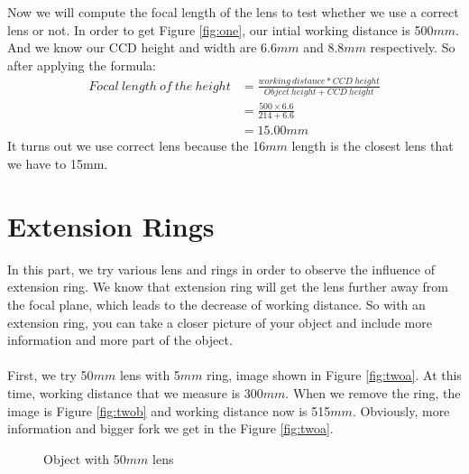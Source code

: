 \documentclass[english]{article}
\begin{document}
Now we will compute the focal length of the lens to test whether we use a correct lens or not.
In order to get Figure \ref{fig:one}, our intial working distance is 500$mm$.
And we know our CCD height and width are 6.6$mm$ and 8.8$mm$ respectively.
So after applying the formula:
\begin{align*} 
	Focal\ length\ of\ the\ height &= \frac{working\ distance * CCD\ height}{Object\ height + CCD\ height}\\
	&= \frac{500 \times 6.6}{214 + 6.6} \\
	&= 15.00mm
\end{align*}
It turns out we use correct lens because the 16$mm$ length is the closest lens that we have to 15mm.
\section{Extension Rings}
In this part, we try various lens and rings in order to observe the influence of extension ring.
We know that extension ring will get the lens further away from the focal plane, which leads to the decrease of working distance.
So with an extension ring, you can take a closer picture of your object and include more information and more part of the object.\\
\\
First, we try 50$mm$ lens with 5$mm$ ring, image shown in Figure \ref{fig:twoa}.
At this time, working distance that we measure is 300$mm$.
When we remove the ring, the image is Figure \ref{fig:twob} and working distance now is 515$mm$. Obviously, more information and bigger fork we get in the Figure \ref{fig:twoa}.
\begin{figure}[H]
	\centering
	\caption{Object with 50$mm$ lens}
	\label{fig:two}
\end{figure}
\end{document}
